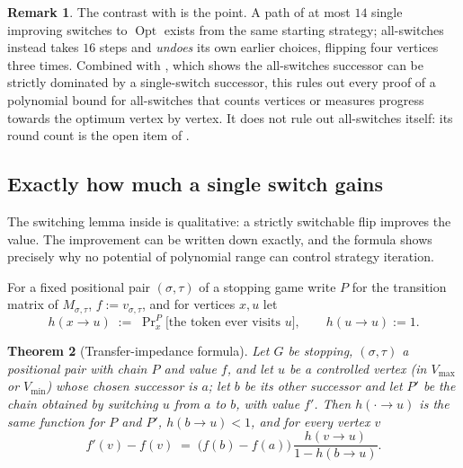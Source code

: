 \documentclass[11pt]{article}
\theoremstyle{plain}
\newtheorem{theorem}{Theorem}[section]
\theoremstyle{definition}
\newtheorem{remark}[theorem]{Remark}
\DeclareMathOperator{\Opt}{Opt}
\newcommand{\Vmax}{V_{\max}}
\newcommand{\Vmin}{V_{\min}}
\begin{document}
\begin{remark}
The contrast with  is the point. A path of at most
$14$ single improving switches to $\Opt$ exists from the same starting
strategy; all-switches instead takes $16$ steps and \emph{undoes} its own
earlier choices, flipping four vertices three times. Combined with
, which shows the all-switches successor
can be strictly dominated by a single-switch successor, this rules out
every proof of a polynomial bound for all-switches that counts vertices or
measures progress towards the optimum vertex by vertex. It does not rule
out all-switches itself: its round count is the open item of
.
\end{remark}

\subsection{Exactly how much a single switch gains}

The switching lemma inside  is qualitative: a
strictly switchable flip improves the value. The improvement can be
written down exactly, and the formula shows precisely why no potential of
polynomial range can control strategy iteration.

For a fixed positional pair $(\sigma,\tau)$ of a stopping game write $P$
for the transition matrix of $M_{\sigma,\tau}$, $f:=v_{\sigma,\tau}$, and
for vertices $x,u$ let
\[
  h(x\to u)\;:=\;\Pr\nolimits^{P}_{x}\bigl[\text{the token ever visits } u\bigr],
  \qquad h(u\to u):=1 .
\]

\begin{theorem}[Transfer-impedance formula]\label{thm:impedance}
Let $G$ be stopping, $(\sigma,\tau)$ a positional pair with chain $P$ and
value $f$, and let $u$ be a controlled vertex (in $\Vmax$ or $\Vmin$)
whose chosen successor is $a$; let $b$ be its other successor and let
$P'$ be the chain obtained by switching $u$ from $a$ to $b$, with value
$f'$. Then $h(\cdot\to u)$ is the same function for $P$ and $P'$,
$h(b\to u)<1$, and for every vertex $v$
\[
  f'(v)-f(v)\;=\;\bigl(f(b)-f(a)\bigr)\,\frac{h(v\to u)}{1-h(b\to u)} .
\]
\end{theorem}
\end{document}
